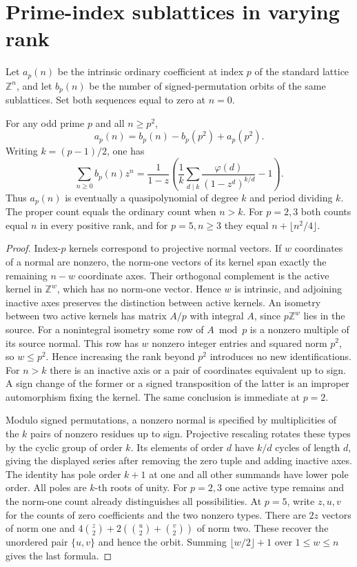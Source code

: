 \section{Prime-index sublattices in varying rank}
Let \(a_p(n)\) be the intrinsic ordinary coefficient at index \(p\) of the standard lattice \(\mathbb Z^n\), and let \(b_p(n)\) be the number of signed-permutation orbits of the same sublattices. Set both sequences equal to zero at \(n=0\).
\begin{proposition}
For any odd prime \(p\) and all \(n\ge p^2\),
\[
 a_p(n)=b_p(n)-b_p(p^2)+a_p(p^2).
\]
Writing \(k=(p-1)/2\), one has
\[
 \sum_{n\ge0} b_p(n)z^n=\frac1{1-z}
 \left(\frac1k\sum_{d\mid k}\frac{\varphi(d)}{(1-z^d)^{k/d}}-1\right).
\]
Thus \(a_p(n)\) is eventually a quasipolynomial of degree \(k\) and period dividing \(k\). The proper count equals the ordinary count when \(n>k\). For \(p=2,3\) both counts equal \(n\) in every positive rank, and for \(p=5,n\ge3\) they equal \(n+\lfloor n^2/4\rfloor\).
\end{proposition}
\begin{proof}
Index-\(p\) kernels correspond to projective normal vectors. If \(w\) coordinates of a normal are nonzero, the norm-one vectors of its kernel span exactly the remaining \(n-w\) coordinate axes. Their orthogonal complement is the active kernel in \(\mathbb Z^w\), which has no norm-one vector. Hence \(w\) is intrinsic, and adjoining inactive axes preserves
the distinction between active kernels. An isometry between two active kernels has matrix \(A/p\) with integral \(A\), since \(p\mathbb Z^w\) lies in the source. For a nonintegral isometry some row of \(A\bmod p\) is a nonzero multiple of its source normal. This row has \(w\) nonzero integer entries and squared norm \(p^2\), so \(w\le p^2\). Hence increasing the rank beyond \(p^2\) introduces no new identifications. For \(n>k\) there is an inactive axis or a pair of coordinates equivalent up to sign. A sign change of the former or a signed transposition of the latter is an improper automorphism fixing the kernel. The same conclusion is immediate at \(p=2\).

Modulo signed permutations, a nonzero normal is specified by multiplicities of the \(k\) pairs of nonzero residues up to sign. Projective rescaling rotates these types by the cyclic group of order \(k\). Its elements of order \(d\) have \(k/d\) cycles of length \(d\), giving the displayed series after removing the zero tuple and adding inactive axes. The identity has pole order \(k+1\) at one and all other summands have lower pole order. All poles are \(k\)-th roots of unity. For \(p=2,3\) one active type remains and the norm-one count already distinguishes all possibilities. At \(p=5\), write \(z,u,v\) for the counts of zero coefficients and the two nonzero types. There are \(2z\) vectors of norm one and \(4\binom z2+2(\binom u2+\binom v2)\) of norm two. These recover the unordered pair \(\{u,v\}\) and hence the orbit. Summing \(\lfloor w/2\rfloor+1\) over \(1\le w\le n\) gives the last formula.
\end{proof}

